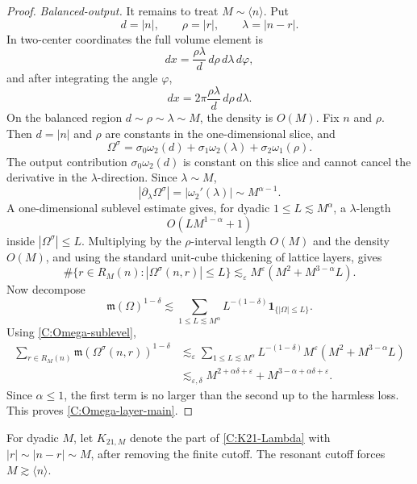 \documentclass[10pt]{amsart}
\numberwithin{equation}{section}
\theoremstyle{plain}
\theoremstyle{definition}
\theoremstyle{remark}
\newcommand{\eps}{\varepsilon}
\newcommand{\la}{\langle}
\newcommand{\ra}{\rangle}
\newcommand{\frakm}{\mathfrak{m}}
\begin{document}
\begin{proof}
\emph{Balanced-output.}  It remains to treat \(M\sim\la n\ra\).  Put
\[
        d=|n|,
        \qquad
        \rho=|r|,
        \qquad
        \lambda=|n-r|.
\]
In two-center coordinates the full volume element is
\[
        dx=\frac{\rho\lambda}{d}\,d\rho\,d\lambda\,d\varphi,
\]
and after integrating the angle \(\varphi\),
\begin{equation}\label{C:two-center-C}
        dx=2\pi\frac{\rho\lambda}{d}\,d\rho\,d\lambda.
\end{equation}
On the balanced region \(d\sim\rho\sim\lambda\sim M\), the density is \(O(M)\).  Fix \(n\) and \(\rho\).  Then \(d=|n|\) and \(\rho\) are constants in the one-dimensional slice, and
\[
        \Omega^\sigma
        =\sigma_0\omega_2(d)+\sigma_1\omega_2(\lambda)+\sigma_2\omega_1(\rho).
\]
The output contribution \(\sigma_0\omega_2(d)\) is constant on this slice and cannot cancel the derivative in the \(\lambda\)-direction.  Since \(\lambda\sim M\),
\[
        |\partial_\lambda\Omega^\sigma|
        =|\omega_2'(\lambda)|
        \sim M^{\alpha-1}.
\]
A one-dimensional sublevel estimate gives, for dyadic \(1\le L\lesssim M^\alpha\), a \(\lambda\)-length
\[
        O(LM^{1-\alpha}+1)
\]
inside \(|\Omega^\sigma|\le L\).  Multiplying by the \(\rho\)-interval length \(O(M)\) and the density \(O(M)\), and using the standard unit-cube thickening of lattice layers, gives
\begin{equation}\label{C:Omega-sublevel}
        \#\{r\in R_M(n): |\Omega^\sigma(n,r)|\le L\}
        \lesssim_\eps M^\eps(M^2+M^{3-\alpha}L).
\end{equation}
Now decompose
\[
        \frakm(\Omega)^{1-\delta}
        \lesssim
        \sum_{1\le L\lesssim M^\alpha}
        L^{-(1-\delta)}\mathbf 1_{\{|\Omega|\le L\}}.
\]
Using \eqref{C:Omega-sublevel},
\begin{align*}
        \sum_{r\in R_M(n)}\frakm(\Omega^\sigma(n,r))^{1-\delta}
        &\lesssim_\eps
        \sum_{1\le L\lesssim M^\alpha}
        L^{-(1-\delta)}M^\eps(M^2+M^{3-\alpha}L)  \\
        &\lesssim_{\eps,\delta}
        M^{2+\alpha\delta+\eps}+M^{3-\alpha+\alpha\delta+\eps}.
\end{align*}
Since \(\alpha\le1\), the first term is no larger than the second up to the harmless loss.  This proves \eqref{C:Omega-layer-main}.
\end{proof}

For dyadic \(M\), let \(K_{21,M}\) denote the part of \eqref{C:K21-Lambda} with \(|r|\sim |n-r|\sim M\), after removing the finite cutoff.  The resonant cutoff forces \(M\gtrsim\la n\ra\).
\end{document}

